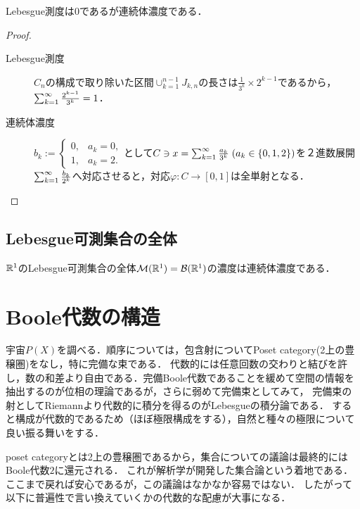 \documentclass[uplatex, dvipdfmx]{jsreport}
\begin{document}
\begin{proposition}[サイズと長さとの概念の違い]
    Lebesgue測度は$0$であるが連続体濃度である．
\end{proposition}
\begin{proof}\mbox{}
    \begin{description}
        \item[Lebesgue測度] $C_n$の構成で取り除いた区間$\cup_{k=1}^{n-1}J_{k,n}$の長さは$\frac{1}{3^k}\times 2^{k-1}$であるから，$\sum_{k=1}^\infty\frac{2^{k-1}}{3^k}=1$．
        \item[連続体濃度] $b_k:=\begin{cases}0,&a_k=0,\\1,&a_k=2.\end{cases}$として$C\ni x=\sum_{k=1}^\infty\frac{a_k}{3^k}\;(a_k\in\{0,1,2\})$を２進数展開$\sum_{k=1}^\infty\frac{b_k}{2^k}$へ対応させると，対応$\varphi:C\to[0,1]$は全単射となる．
    \end{description}
\end{proof}

\subsection{Lebesgue可測集合の全体}

\begin{corollary}
    $\mathbb{R}^1$のLebesgue可測集合の全体$\mathcal{M}(\mathbb{R}^1)=\mathcal{B}(\mathbb{R}^1)$の濃度は連続体濃度である．
\end{corollary}

\section{Boole代数の構造}

\begin{tcolorbox}[colframe=ForestGreen, colback=ForestGreen!10!white,breakable,colbacktitle=ForestGreen!40!white,coltitle=black,fonttitle=\bfseries\sffamily,
title=]
    宇宙$P(X)$を調べる．順序については，包含射についてPoset category(2上の豊穣圏)をなし，特に完備な束である．
    代数的には任意回数の交わりと結びを許し，数の和差より自由である．完備Boole代数であることを緩めて空間の情報を抽出するのが位相の理論であるが，さらに弱めて完備束としてみて，
    完備束の射としてRiemannより代数的に積分を得るのがLebesgueの積分論である．
    すると構成が代数的であるため（ほぼ極限構成をする），自然と種々の極限について良い振る舞いをする．

    poset categoryとは2上の豊穣圏であるから，集合についての議論は最終的にはBoole代数$2$に還元される．
    これが解析学が開発した集合論という着地である．
    ここまで戻れば安心であるが，この議論はなかなか容易ではない．
    したがって以下に普遍性で言い換えていくかの代数的な配慮が大事になる．
\end{tcolorbox}
\end{document}
